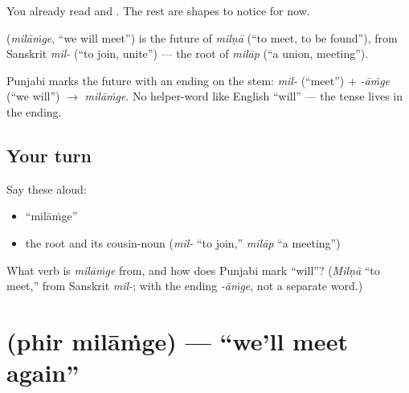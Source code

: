 You already read \textbf{} and \textbf{}. The rest are shapes to notice for now.

\begin{cousinweb}
\textbf{} (\emph{milāṁge}, \textquotedblleft{}we will meet\textquotedblright{}) is the future of \emph{milṇā} (\textquotedblleft{}to meet, to be found\textquotedblright{}), from Sanskrit \emph{mil-} (\textquotedblleft{}to join, unite\textquotedblright{}) — the root of \emph{milāp} (\textquotedblleft{}a union, meeting\textquotedblright{}).
\end{cousinweb}

\begin{grammarlens}[title={Grammar Lens: the future is an ending}]
Punjabi marks the future with an ending on the stem: \emph{mil-} (\textquotedblleft{}meet\textquotedblright{}) + \emph{-āṁge} (\textquotedblleft{}we will\textquotedblright{}) $\to$ \emph{milāṁge}. No helper-word like English \textquotedblleft{}will\textquotedblright{} — the tense lives in the ending.
\end{grammarlens}

\subsection*{Your turn}
Say these aloud:

\begin{itemize}
\raggedright
  \item \textquotedblleft{}milāṁge\textquotedblright{}
  \item the root and its cousin-noun (\emph{mil-} \textquotedblleft{}to join,\textquotedblright{} \emph{milāp} \textquotedblleft{}a meeting\textquotedblright{})
\end{itemize}

\begin{tcolorbox}[breakable,colback=teal!4,colframe=teal!35!black,title={Before you move on}]
What verb is \emph{milāṁge} from, and how does Punjabi mark \textquotedblleft{}will\textquotedblright{}? (\emph{Milṇā} \textquotedblleft{}to meet,\textquotedblright{} from Sanskrit \emph{mil-}; with the ending \emph{-āṁge}, not a separate word.)
\end{tcolorbox}
\section[\texorpdfstring{\pa{ਫਿਰ} \pa{ਮਿਲਾਂਗੇ} (phir milāṁge)}{ਫਿਰ ਮਿਲਾਂਗੇ (phir milāṁge)}]{  (phir milāṁge) — \textquotedblleft{}we'll meet again\textquotedblright{}}

